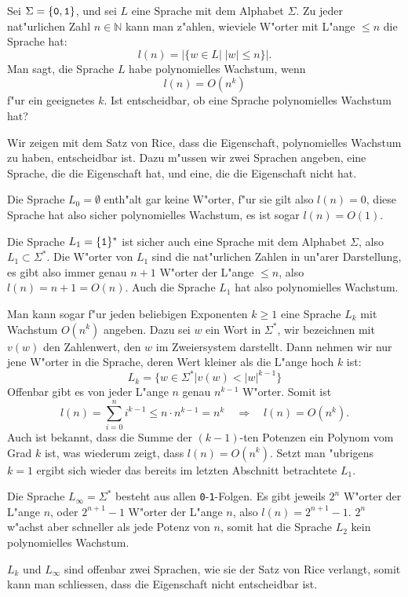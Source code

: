 Sei $\Sigma=\{\text{\tt 0},\text{\tt 1}\}$, und sei $L$ eine Sprache
mit dem Alphabet $\Sigma$. Zu jeder nat"urlichen Zahl $n\in\mathbb N$
kann man z"ahlen, wieviele W"orter mit L"ange $\le n$ die Sprache
hat:
\[
l(n)=|\{w\in L|\;|w|\le n\}|.
\]
Man sagt, die Sprache $L$ habe polynomielles Wachstum, wenn
\[
l(n)=O(n^k)
\]
f"ur ein geeignetes $k$. Ist entscheidbar, ob eine Sprache polynomielles
Wachstum hat?

\begin{loesung}
Wir zeigen mit dem Satz von Rice, dass die Eigenschaft, polynomielles
Wachstum zu haben, entscheidbar ist. Dazu m"ussen wir zwei Sprachen
angeben, eine Sprache, die die Eigenschaft hat, und eine, die die
Eigenschaft nicht hat.

Die Sprache $L_0=\emptyset$ enth"alt gar keine W"orter, f"ur sie
gilt also $l(n)=0$, diese Sprache hat also sicher polynomielles
Wachstum, es ist sogar $l(n)=O(1)$.

Die Sprache $L_1=\{\text{\tt 1}\}^*$ ist sicher auch eine Sprache mit
dem Alphabet $\Sigma$, also $L_1\subset \Sigma^*$. Die W"orter
von $L_1$ sind die nat"urlichen Zahlen in un"arer Darstellung,
es gibt also immer genau $n+1$ W"orter der L"ange $\le n$, also
$l(n)=n+1=O(n)$. Auch die Sprache $L_1$ hat also polynomielles Wachstum.

Man kann sogar f"ur jeden beliebigen Exponenten $k\ge 1$ eine Sprache $L_k$
mit Wachstum $O(n^k)$ angeben. Dazu sei $w$ ein Wort in $\Sigma^*$,
wir bezeichnen mit $v(w)$ den Zahlenwert, den $w$ im Zweiersystem
darstellt. Dann nehmen wir nur jene W"orter in die Sprache,
deren Wert kleiner als die L"ange hoch $k$ ist:
\[
L_k=\{ w\in\Sigma^*| v(w) < |w|^{k-1}\}
\]
Offenbar gibt es von jeder L"ange $n$ genau $n^{k-1}$ W"orter.
Somit ist
\[
l(n)=\sum_{i=0}^ni^{k-1}\le n\cdot n^{k-1}=n^k\quad\Rightarrow\quad l(n)=O(n^k).
\]
Auch ist bekannt, dass die Summe der $(k-1)$-ten Potenzen ein
Polynom vom Grad $k$ ist, was wiederum zeigt, dass $l(n)=O(n^k)$.
Setzt man "ubrigens $k=1$ ergibt
sich wieder das bereits im letzten Abschnitt betrachtete
$L_1$.

Die Sprache $L_\infty=\Sigma^*$ besteht aus allen {\tt 0}-{\tt 1}-Folgen.
Es gibt jeweils $2^n$ W"orter der L"ange $n$, oder $2^{n+1}-1$ W"orter
der L"ange $n$, also $l(n)=2^{n+1}-1$. $2^n$ w"achst aber schneller
als jede Potenz von $n$, somit hat die Sprache $L_2$ kein polynomielles
Wachstum.

$L_k$ und $L_\infty$ sind offenbar zwei Sprachen, wie sie der Satz von
Rice verlangt, somit kann man schliessen, dass die Eigenschaft
nicht entscheidbar ist.
\end{loesung}
